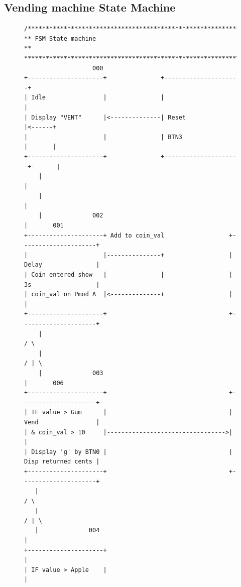 \subsection{Vending machine State Machine}\label{subsec: Vending machine State Machin}
\begin{figure}[H]
	\begin{verbatim}       
/*********************************************************************************
** FSM State machine                                                            **
**********************************************************************************
                   000                                  
+---------------------+               +---------------------+
| Idle                |               |                     |
| Display "VENT"      |<--------------| Reset               |<------+
|                     |               | BTN3                |       |
+---------------------+               +---------------------+-      |
    |                                                               |
    |                                                               |
    |              002                                              |       001
+---------------------+ Add to coin_val                  +---------------------+
|                     |---------------+                  | Delay               |
| Coin entered show   |               |                  | 3s                  |
| coin_val on Pmod A  |<--------------+                  |                     |
+---------------------+                                  +---------------------+
    |                                                              / \ 
    |                                                             / | \
    |              003                                              |       006
+---------------------+                                  +---------------------+
| IF value > Gum      |                                  | Vend                |
| & coin_val > 10     |--------------------------------->|                     |
| Display 'g' by BTN0 |                                  | Disp returned cents |
+---------------------+                                  +---------------------+
   |                                                               / \ 
   |                                                              / | \
   |              004                                               |
+---------------------+                                             |
| IF value > Apple    |                                             |

\end{verbatim}
\end{figure}
